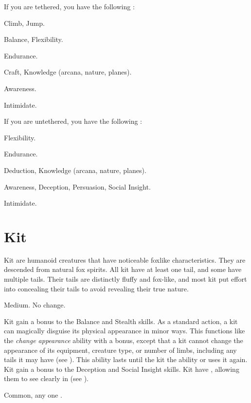       If you are tethered, you have the following :
      \begin{raggeditemize}
        \item {} Climb, Jump.
        \item {} Balance, Flexibility.
        \item {} Endurance.
        \item {} Craft, Knowledge (arcana, nature, planes).
        \item {} Awareness.
        \item {} Intimidate.
      \end{raggeditemize}

      If you are untethered, you have the following :
      \begin{raggeditemize}
        \item {} Flexibility.
        \item {} Endurance.
        \item {} Deduction, Knowledge (arcana, nature, planes).
        \item {} Awareness, Deception, Persuasion, Social Insight.
        \item {} Intimidate.
      \end{raggeditemize}

\section{Kit}

  Kit are humanoid creatures that have noticeable foxlike characteristics.
  They are descended from natural fox spirits.
  All kit have at least one tail, and some have multiple tails.
  Their tails are distinctly fluffy and fox-like, and most kit put effort into concealing their tails to avoid revealing their true nature.

   Medium.
   No change.
  \begin{raggeditemize}
     Kit gain a  bonus to the Balance and Stealth skills.
     As a standard action, a kit can magically disguise its physical appearance in minor ways.
      This functions like the \textit{change appearance} ability with a  bonus, except that a kit cannot change the appearance of its equipment, creature type, or number of limbs, including any tails it may have (see ).
      This ability lasts until the kit  the ability or uses it again.
     Kit gain a  bonus to the Deception and Social Insight skills.
     Kit have , allowing them to see clearly in  (see ).
  \end{raggeditemize}
   Common, any one .

